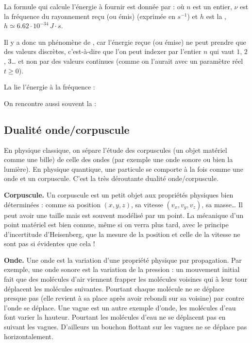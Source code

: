 \documentclass[11pt,class=report,crop=false]{standalone}
\begin{document}

La formule qui calcule l'énergie à fournir est donnée par :
où $n$ est un entier, $\nu$ est la fréquence du rayonnement reçu (ou émis) (exprimée en $s^{-1}$)
et $h$ est la , $h \simeq 6.62 \cdot 10^{-34} \, J\cdot s$.

Il y a donc un phénomène de , car l'énergie reçue (ou émise) ne peut prendre que des valeurs discrètes, c'est-à-dire que l'on peut indexer par l'entier $n$ qui vaut $1$, $2$, $3$\ldots{}  et non par des valeurs continues (comme on l'aurait avec un paramètre réel $t \ge 0$).

La  lie l'énergie à la fréquence :


On rencontre aussi souvent la :




\subsection{Dualité onde/corpuscule}


En physique classique, on sépare l'étude des corpuscules (un objet matériel comme une bille) de celle des ondes (par exemple une onde sonore ou bien la lumière). En physique quantique, une particule se comporte à la fois comme une onde et un corpuscule. C'est la très déroutante \og{}dualité onde/corpuscule\fg{}.

\textbf{Corpuscule.} 
Un \og{}corpuscule\fg{} est un petit objet aux propriétés physiques bien déterminées : comme sa position $(x,y,z)$, sa vitesse $(v_x,v_y,v_z)$, sa masse\ldots{} Il peut avoir une taille mais est souvent modélisé par un point.
La mécanique d'un point matériel est bien connue, même si on verra plus tard, avec le principe d'incertitude d'Heisenberg, que la mesure de la position et celle de la vitesse ne sont pas si évidentes que cela !


\textbf{Onde.}
Une \og{}onde\fg{} est la variation d'une propriété physique par propagation. Par exemple, une onde sonore est la variation de la pression : un mouvement initial fait que des molécules d'air viennent frapper les molécules voisines qui à leur tour déplacent les molécules suivantes. Pourtant chaque molécule ne se déplace presque pas (elle revient à sa place après avoir rebondi sur sa voisine) par contre l'onde se déplace.
Une vague est un autre exemple d'onde, les molécules d'eau font varier la hauteur. Pourtant les molécules d'eau ne se déplacent pas en suivant les vagues. D'ailleurs un bouchon flottant sur les vagues ne se déplace pas horizontalement.
\end{document}
